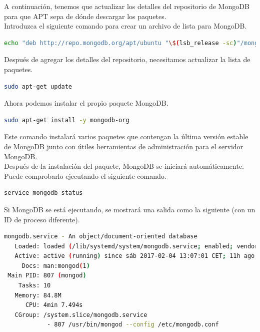 A continuación, tenemos que actualizar los detalles del repositorio de MongoDB para que APT sepa de dónde descargar los paquetes.\\

Introduzca el siguiente comando para crear un archivo de lista para MongoDB.\\

\begin{lstlisting}[language=bash]
echo "deb http://repo.mongodb.org/apt/ubuntu "\$(lsb_release -sc)"/mongodb-org/3.0 multiverse" | sudo tee /etc/apt/sources.list.d/mongodb-org-3.0.list
\end{lstlisting}

Después de agregar los detalles del repositorio, necesitamos actualizar la lista de paquetes.\\

\begin{lstlisting}[language=bash]
sudo apt-get update
\end{lstlisting}


Ahora podemos instalar el propio paquete MongoDB.\\

\begin{lstlisting}[language=bash]
sudo apt-get install -y mongodb-org
\end{lstlisting}

Este comando instalará varios paquetes que contengan la última versión estable de MongoDB junto con útiles herramientas de administración para el servidor MongoDB.\\

Después de la instalación del paquete, MongoDB se iniciará automáticamente. Puede comprobarlo ejecutando el siguiente comando.\\

\begin{lstlisting}[language=bash]
service mongodb status
\end{lstlisting}

Si MongoDB se está ejecutando, se mostrará una salida como la siguiente (con un ID de proceso diferente).\\

\begin{lstlisting}[language=bash]
 mongodb.service - An object/document-oriented database
   Loaded: loaded (/lib/systemd/system/mongodb.service; enabled; vendor preset: enabled)
   Active: active (running) since sáb 2017-02-04 13:07:01 CET; 11h ago
     Docs: man:mongod(1)
 Main PID: 807 (mongod)
    Tasks: 10
   Memory: 84.8M
      CPU: 4min 7.494s
   CGroup: /system.slice/mongodb.service
            - 807 /usr/bin/mongod --config /etc/mongodb.conf
\end{lstlisting}

